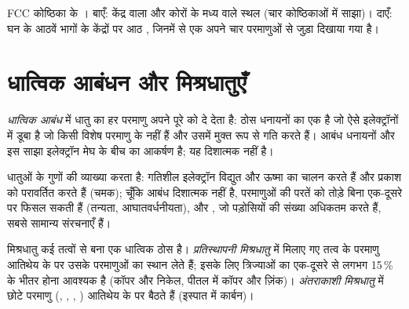 \begin{omfigure}
{\small FCC कोष्ठिका के । बाएँ: केंद्र वाला  और कोरों के मध्य वाले स्थल (चार कोष्ठिकाओं में साझा)। दाएँ:
घन के आठवें भागों के केंद्रों पर आठ ,
जिनमें से एक अपने चार परमाणुओं से जुड़ा दिखाया गया है।}
\end{omfigure}

\section{धात्विक आबंधन और मिश्रधातुएँ}

\begin{definition}[धात्विक आबंध]\label{def:b1:crystals-metals:metallic-bond}
\emph{धात्विक आबंध} में धातु का हर परमाणु
अपने  पूरे  को दे देता है: ठोस धनायनों का एक 
है जो ऐसे इलेक्ट्रॉनों में डूबा है जो किसी विशेष परमाणु के नहीं हैं और
उसमें मुक्त रूप से गति करते हैं। आबंध धनायनों और इस साझा इलेक्ट्रॉन मेघ के बीच का
आकर्षण है; यह दिशात्मक नहीं है।
\end{definition}

\begin{proposition}[धातुओं के गुण]\label{prop:b1:crystals-metals:properties}
 धातुओं के गुणों की व्याख्या करता है: गतिशील इलेक्ट्रॉन
विद्युत और ऊष्मा का चालन करते हैं और प्रकाश को परावर्तित करते हैं (चमक); चूँकि आबंध
दिशात्मक नहीं है, परमाणुओं की परतें  को तोड़े बिना एक-दूसरे पर
फिसल सकती हैं (तन्यता, आघातवर्धनीयता), और , जो
पड़ोसियों की संख्या अधिकतम करते हैं, सबसे सामान्य संरचनाएँ हैं।
\end{proposition}
\admitted

\begin{definition}[मिश्रधातुएँ]\label{def:b1:crystals-metals:alloy}
मिश्रधातु कई तत्वों से बना एक धात्विक ठोस है।
\emph{प्रतिस्थापनी मिश्रधातु} में मिलाए गए तत्व के
परमाणु आतिथेय के  पर उसके परमाणुओं का स्थान लेते हैं; इसके लिए
त्रिज्याओं का एक-दूसरे से लगभग 15\,\% के भीतर होना आवश्यक है (कॉपर और निकेल, पीतल में कॉपर और
ज़िंक)। \emph{अंतराकाशी मिश्रधातु} में
छोटे परमाणु (, , , ) आतिथेय के  पर
बैठते हैं (इस्पात में कार्बन)।
\end{definition}

